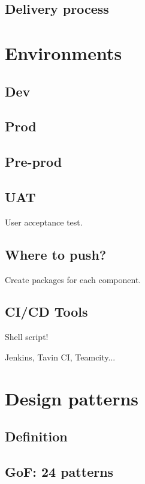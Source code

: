 \documentclass[a4paper,11pt]{article}
\begin{document}
\subsection{Delivery process}

\section{Environments}

\subsection{Dev}

\subsection{Prod}

\subsection{Pre-prod}

\subsection{UAT}

User acceptance test.

\subsection{Where to push?}

Create packages for each component.

\subsection{CI/CD Tools}

Shell script!

Jenkins, Tavin CI, Teamcity...

\section{Design patterns}

\subsection{Definition}

\subsection{GoF: 24 patterns}
\end{document}
